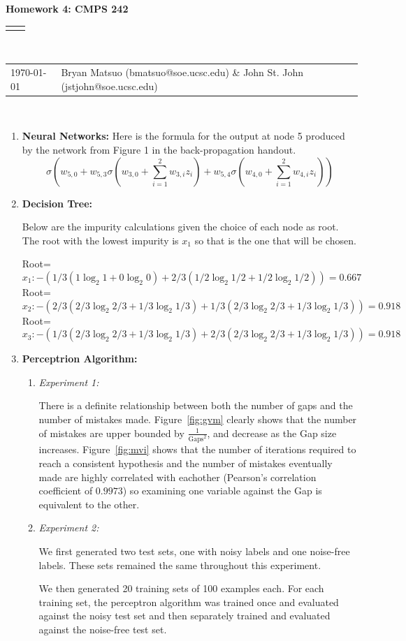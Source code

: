 \documentclass[12pt]{article}
\renewcommand{\title}[1]{\textbf{#1}\\}
\renewcommand{\line}{\begin{tabularx}{\textwidth}{X>{\raggedleft}X}\hline\\\end{tabularx}\\[-0.5cm]}
\newcommand{\leftright}[2]{\begin{tabularx}{\textwidth}{X>{\raggedleft}X}#1%
& #2\\\end{tabularx}\\[-0.5cm]}
\begin{document}
\title{Homework 4: CMPS 242}
\line
\leftright{\today}{Bryan Matsuo (bmatsuo@soe.ucsc.edu) \& John St. John (jstjohn@soe.ucsc.edu)} %
\begin{enumerate}
\item \textbf{Neural Networks:}
Here is the formula for the output at node 5 produced by the network from Figure 1 in the back-propagation handout.
\[
\sigma\left(w_{5,0}+w_{5,3}\sigma\left(w_{3,0}+\sum_{i=1}^2w_{3,i}z_i\right)+w_{5,4}\sigma\left(w_{4,0}+\sum_{i=1}^2w_{4,i}z_i\right) \right)
\]

\item \textbf{Decision Tree:}

Below are the impurity calculations given the choice of each node as root. The root with the lowest impurity is $x_1$ so that is the one that will be chosen.

Root=\[x_1: -\left(1/3\left(1\log_2 1 + 0\log_2 0 \right)+ 2/3 \left( 1/2\log_2 1/2 + 1/2\log_2 1/2\right)\right) = 0.667\]
Root=\[x_2: -\left(2/3\left( 2/3\log_2 2/3 + 1/3\log_2 1/3 \right) + 1/3 \left( 2/3\log_2 2/3 + 1/3\log_2 1/3 \right) \right)= 0.918 \]
Root=\[x_3: -\left(1/3\left( 2/3\log_2 2/3 + 1/3\log_2 1/3\right) + 2/3 \left( 2/3\log_2 2/3 + 1/3\log_2 1/3 \right)\right) =  0.918 \]


\item \textbf{Perceptrion Algorithm:}

\begin{enumerate}
\item \textit{Experiment 1:}

There is a definite relationship between both the number of gaps and the number of mistakes made. Figure~\ref{fig:gvm} clearly shows that the number of mistakes are upper bounded by $\frac{1}{\text{Gaps}^2}$, and decrease as the Gap size increases. Figure~\ref{fig:mvi} shows that the number of iterations required to reach a consistent hypothesis and the number of mistakes eventually made are highly correlated with eachother (Pearson's correlation coefficient of $0.9973$) so examining one variable against the Gap is equivalent to the other.



\item \textit{Experiment 2:}

We first generated two test sets, one with noisy labels and one noise-free
labels. These sets remained the same throughout this experiment.

We then generated 20 training sets of 100 examples each. For each training
set, the perceptron algorithm was trained once and evaluated against the
noisy test set and then separately trained and evaluated against the
noise-free test set.


\end{enumerate}
\end{enumerate}
\end{document}
